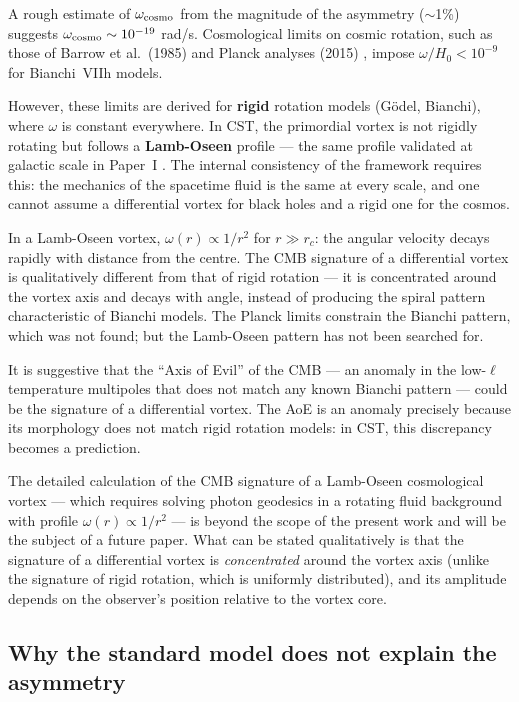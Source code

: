 \documentclass[10pt,a4paper]{article}
\begin{document}
A rough estimate of $\omega_{\rm cosmo}$ from the magnitude of the asymmetry ($\sim$1\%) suggests $\omega_{\rm cosmo} \sim 10^{-19}$ rad/s. Cosmological limits on cosmic rotation, such as those of Barrow et al.\ (1985) \cite{Barrow1985} and Planck analyses (2015) \cite{PlanckCollaboration2018}, impose $\omega/H_0 < 10^{-9}$ for Bianchi~VIIh models.

However, these limits are derived for \textbf{rigid} rotation models (G\"odel, Bianchi), where $\omega$ is constant everywhere. In CST, the primordial vortex is not rigidly rotating but follows a \textbf{Lamb-Oseen} profile --- the same profile validated at galactic scale in Paper~I \cite{Vizzutti2026}. The internal consistency of the framework requires this: the mechanics of the spacetime fluid is the same at every scale, and one cannot assume a differential vortex for black holes and a rigid one for the cosmos.

In a Lamb-Oseen vortex, $\omega(r) \propto 1/r^2$ for $r \gg r_c$: the angular velocity decays rapidly with distance from the centre. The CMB signature of a differential vortex is qualitatively different from that of rigid rotation --- it is concentrated around the vortex axis and decays with angle, instead of producing the spiral pattern characteristic of Bianchi models. The Planck limits constrain the Bianchi pattern, which was not found; but the Lamb-Oseen pattern has not been searched for.

It is suggestive that the ``Axis of Evil'' of the CMB --- an anomaly in the low-$\ell$ temperature multipoles that does not match any known Bianchi pattern --- could be the signature of a differential vortex. The AoE is an anomaly precisely because its morphology does not match rigid rotation models: in CST, this discrepancy becomes a prediction.

The detailed calculation of the CMB signature of a Lamb-Oseen cosmological vortex --- which requires solving photon geodesics in a rotating fluid background with profile $\omega(r) \propto 1/r^2$ --- is beyond the scope of the present work and will be the subject of a future paper. What can be stated qualitatively is that the signature of a differential vortex is \textit{concentrated} around the vortex axis (unlike the signature of rigid rotation, which is uniformly distributed), and its amplitude depends on the observer's position relative to the vortex core.

\subsection{Why the standard model does not explain the asymmetry}
\end{document}
